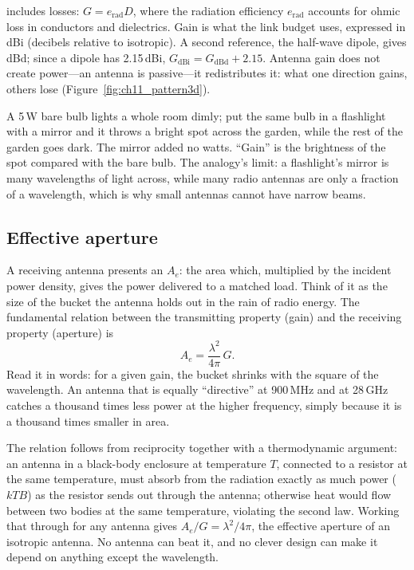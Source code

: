  includes losses: $G=e_{\text{rad}}D$, where the radiation efficiency $e_{\text{rad}}$
accounts for ohmic loss in conductors and dielectrics. Gain is what the link budget uses,
expressed in dBi (decibels relative to isotropic). A second reference, the half-wave dipole,
gives dBd; since a dipole has 2.15\,dBi, $G_{\text{dBi}}=G_{\text{dBd}}+2.15$. Antenna gain
does not create power---an antenna is passive---it redistributes it: what one direction
gains, others lose (Figure~\ref{fig:ch11_pattern3d}).

\begin{analogy}
A 5\,W bare bulb lights a whole room dimly; put the same bulb in a flashlight with a mirror and
it throws a bright spot across the garden, while the rest of the garden goes dark. The mirror
added no watts. ``Gain'' is the brightness of the spot compared with the bare bulb. The
analogy's limit: a flashlight's mirror is many wavelengths of light across, while many radio
antennas are only a fraction of a wavelength, which is why small antennas cannot have narrow
beams.
\end{analogy}

\subsection{Effective aperture}

A receiving antenna presents an  $A_e$: the area which, multiplied by
the incident power density, gives the power delivered to a matched load. Think of it as the size
of the bucket the antenna holds out in the rain of radio energy. The fundamental relation between
the transmitting property (gain) and the receiving property (aperture) is
\begin{equation}
A_e=\frac{\lambda^2}{4\pi}\,G .
\label{eq:ch11:aperture}
\end{equation}
Read it in words: for a given gain, the bucket shrinks with the square of the wavelength. An
antenna that is equally ``directive'' at 900\,MHz and at 28\,GHz catches a thousand times less
power at the higher frequency, simply because it is a thousand times smaller in area.

\begin{deeper}[Why $A_e/G=\lambda^2/4\pi$ for every antenna]
The relation follows from reciprocity together with a thermodynamic argument: an antenna in a
black-body enclosure at temperature $T$, connected to a resistor at the same temperature, must
absorb from the radiation exactly as much power ($kTB$) as the resistor sends out through the
antenna; otherwise heat would flow between two bodies at the same temperature, violating the
second law. Working that through for any antenna gives $A_e/G=\lambda^2/4\pi$, the effective
aperture of an isotropic antenna. No antenna can beat it, and no clever design can make it
depend on anything except the wavelength.
\end{deeper}

